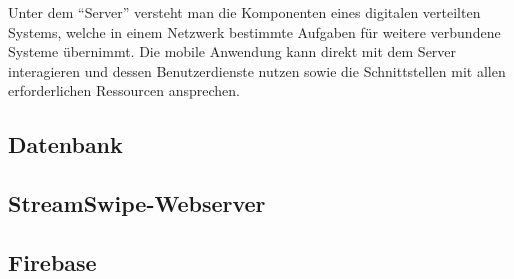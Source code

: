 Unter dem \enquote{Server} versteht man die Komponenten eines digitalen verteilten Systems, welche in einem Netzwerk bestimmte Aufgaben für weitere verbundene Systeme übernimmt.
\newline
Die mobile Anwendung kann direkt mit dem Server interagieren und dessen Benutzerdienste nutzen sowie die Schnittstellen mit allen erforderlichen Ressourcen ansprechen.

\subsection{Datenbank}


\subsection{StreamSwipe-Webserver}




\subsection{Firebase}
\label{sec:implementierung_firebase}


